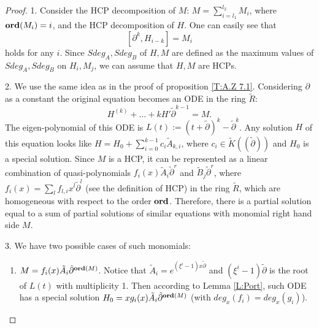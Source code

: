 \documentclass[11pt]{article}
\theoremstyle{definition}
\newcommand{\Ord}{\mathop {\rm \bf ord}}
\theoremstyle{plain}
\numberwithin{equation}{section}
\begin{document}
\begin{proof} 
	1.  Consider the HCP decomposition of $M$: $M=\sum_{i=l_1}^{l_2}M_i$, where $\Ord(M_i)=i$, and the HCP decomposition of $H$. One can easily see that
	$$
	[\partial^k,H_{i-k}]=M_i
	$$
	holds for any $i$. Since $Sdeg_A,Sdeg_B$ of $H,M$ are defined as the maximum values of $Sdeg_A,Sdeg_B$ on $H_i,M_j$,  we can assume that $H,M$ are HCPs. 
	
	2. We use the same idea as in the proof of proposition \ref{T:A.Z 7.1}. Considering $\partial$ as a constant the original equation becomes an ODE in the ring $\tilde{R}$: 
		\begin{equation}
		H^{(k)}+\dots+k H'\tilde{\partial}^{k-1}=M.
		\end{equation}	
        The eigen-polynomial of this ODE is $L(t):=(t+\tilde{\partial})^k-\tilde{\partial}^k$. Any solution $H$ of this equation looks like $H=H_0+\sum_{i=0}^{k-1}c_i\tilde{A}_{k,i}$, where $c_i\in \tilde{K}((\tilde{\partial}))$ and $H_0$ is a special solution. Since $M$ is a HCP, it can be represented as a linear combination of quasi-polynomials  $f_i(x)\tilde{A}_i\tilde{\partial}^r$ and $\tilde{B}_j\tilde{\partial}^r$, where $f_i(x)=\sum_l f_{l,i}x^l\tilde{\partial}^l$ (see the definition of HCP) in the ring $\tilde{R}$, which are homogeneous with respect to the order $\Ord$. Therefore, there is a partial solution equal to a sum of partial solutions of similar equations with monomial right hand side $M$.   
       
       3. We have two possible cases of such monomials:
        \begin{enumerate}
        	\item $M=f_i(x)\tilde{A}_i{ \tilde{\partial}^{\Ord(M)}}$. Notice that $\tilde{A}_i=e^{(\xi^i-1)x\tilde{\partial}}$ and $(\xi^i-1)\tilde{\partial}$ is the root of $L(t)$ with multiplicity 1. Then according to  Lemma \ref{L:Port}, such ODE has a special solution $H_0=xg_i(x)\tilde{A}_i{ \tilde{\partial}^{\Ord(M)}}$ (with $deg_x(f_i)=deg_x(g_i)$). 
 

\end{enumerate}
\end{proof}
\end{document}
